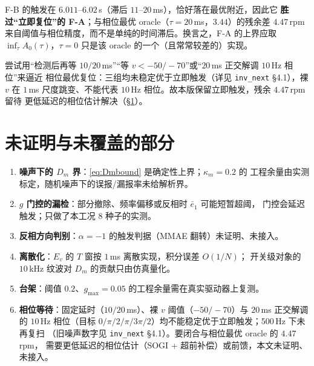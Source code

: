 \documentclass[11pt,a4paper]{article}
\theoremstyle{remark}
\begin{document}
F-B 的触发在 $6.011$--$6.02$\,s（滞后 $11$--$20$\,ms），恰好落在最优附近，因此它
\textbf{胜过“立即复位”的 F-A}；与相位最优 oracle（$\tau=20$\,ms，$3.44$）的残余差
$4.47$\,rpm 来自阈值与相位精度，而不是单纯的时间滞后。换言之，F-A 的上界应取
$\inf_\tau A_0(\tau)$，$\tau=0$ 只是该 oracle 的一个（且常常较差的）实现。

尝试用“检测后再等 $10/20$\,ms”“等 $v<-50/-70$”或“$20$\,ms 正交解调 $10$\,Hz 相位”来逼近
相位最优复位：三组均未稳定优于立即触发（详见 \texttt{inv\_next} \S4.1），裸 $v$ 在
$1$\,ms 尺度跳变、不能代表 $10$\,Hz 相位。故本版保留立即触发，残余 $4.47$\,rpm 留待
更低延迟的相位估计解决（\S\ref{sec:unproven}）。

\section{未证明与未覆盖的部分}\label{sec:unproven}
\begin{enumerate}
\item \textbf{噪声下的 $D_m$ 界}：\eqref{eq:Dmbound} 是确定性上界；$\kappa_m=0.2$ 的
      工程余量由实测标定，随机噪声下的误报/漏报率未给解析界。
\item \textbf{$g$ 门控的漏检}：部分撤除、频率偏移或反相时 $\bar e_1$ 可能短暂超阈，
      门控会延迟触发；只做了本工况 8 种子的实测。
\item \textbf{反相方向判别}：$\alpha=-1$ 的触发判据（MMAE 翻转）未证明、未接入。
\item \textbf{离散化}：$E_v$ 的 $T$ 窗按 $1$\,ms 离散实现，积分误差 $O(1/N)$；
      开关级对象的 $10$\,kHz 纹波对 $D_m$ 的贡献只由仿真量化。
\item \textbf{台架}：阈值 $0.2$、$g_{\max}=0.05$ 的工程余量需在真实驱动器上复测。
\item \textbf{相位等待}：固定延时（$10/20$\,ms）、裸 $v$ 阈值（$-50/-70$）与 $20$\,ms 正交解调的
      $10$\,Hz 相位（目标 $0/\pi/2/\pi/3\pi/2$）均不能稳定优于立即触发；500\,Hz 下未再复扫
      （旧噪声数字见 \texttt{inv\_next} \S4.1）。要闭合与相位最优 oracle 的 $4.47$\,rpm，
      需要更低延迟的相位估计（SOGI + 超前补偿）或前馈，本文未证明、未接入。
\end{enumerate}
\end{document}
